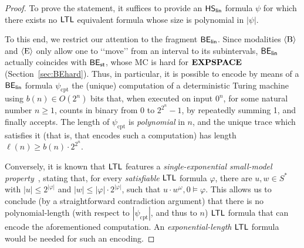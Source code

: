 \begin{proof}
To prove the statement, it suffices to provide an $\text{\sffamily HS}_{\mathsf{lin}}$ formula $\psi$ for which there exists no $\text{\sffamily LTL}$ equivalent formula whose size is polynomial in $|\psi|$.

To this end, we restrict our attention to the fragment $\mathsf{B}\mathsf{E}_{\mathsf{lin}}$. Since modalities $\operatorname{\langle B\rangle}$ and $\operatorname{\langle E\rangle}$ only allow one to \lq\lq move\rq\rq{} from an interval to its subintervals, $\mathsf{B}\mathsf{E}_{\mathsf{lin}}$ actually coincides with $\mathsf{B}\mathsf{E}_{\mathsf{st}}$, whose MC is hard for $\textbf{EXPSPACE}$ (Section~\ref{sec:BEhard}). Thus, in particular, it is possible to encode by means of a $\mathsf{B}\mathsf{E}_{\mathsf{lin}}$ formula $\psi_{\text{cpt}}$ the (unique) computation of a deterministic Turing machine using $b(n)\in O(2^n)$ bits that, when executed on input $0^n$, for some natural number $n\geq 1$, counts in binary from $0$ to $2^{2^n}-1$, by repeatedly summing 1, and finally accepts. The length of $\psi_{\text{cpt}}$ is \emph{polynomial} in $n$, and the unique trace which satisfies it (that is, that encodes such a computation) has length $\ell(n)\geq b(n)\cdot 2^{2^n}$. 


Conversely, it is known that $\text{\sffamily LTL}$ features a \emph{single-exponential small-model property}~\cite{DBLP:books/cu/Demri2016}, 
stating that, for every \emph{satisfiable} $\text{\sffamily LTL}$ formula $\varphi$, there are $u,w\in S^*$ with $|u|\leq 2^{|\varphi|}$ and $|w|\leq |\varphi|\cdot 2^{|\varphi|}$, such that $u\cdot w^\omega ,0 \models \varphi$. 
This allows us to conclude (by a straightforward contradiction argument) that there is no polynomial-length (with respect to $|\psi_{\text{cpt}}|$, and thus to $n$) $\text{\sffamily LTL}$ formula that can encode the aforementioned computation. An \emph{exponential-length} $\text{\sffamily LTL}$ formula would be needed for such an encoding.
\end{proof}


